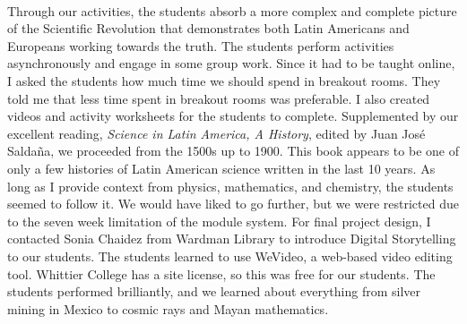 \documentclass[../../../main.tex]{subfiles}
\begin{document}
\\
\vspace{0.25cm}
Through our activities, the students absorb a more complex and complete picture of the Scientific Revolution that demonstrates both Latin Americans and Europeans working towards the truth.  The students perform activities asynchronously and engage in some group work.  Since it had to be taught online, I asked the students how much time we should spend in breakout rooms.  They told me that less time spent in breakout rooms was preferable.  I also created videos and activity worksheets for the students to complete.  Supplemented by our excellent reading, \textit{Science in Latin America, A History}, edited by Juan Jos\'{e} Salda\~{n}a, we proceeded from the 1500s up to 1900.  This book appears to be one of only a few histories of Latin American science written in the last 10 years.  As long as I provide context from physics, mathematics, and chemistry, the students seemed to follow it.  We would have liked to go further, but we were restricted due to the seven week limitation of the module system.  For final project design, I contacted Sonia Chaidez from Wardman Library to introduce Digital Storytelling to our students.  The students learned to use WeVideo, a web-based video editing tool.  Whittier College has a site license, so this was free for our students.  The students performed brilliantly, and we learned about everything from silver mining in Mexico to cosmic rays and Mayan mathematics.
\end{document}
